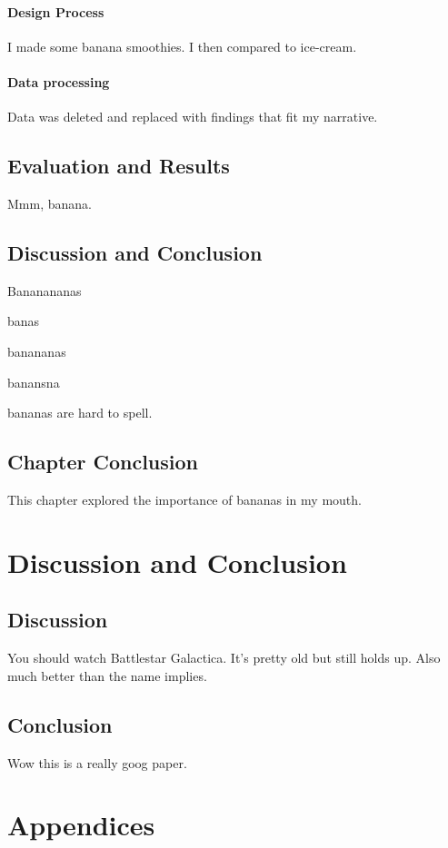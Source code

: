 \documentclass[oneside,openany]{report}
\let\Oldsection\section
\renewcommand{\section}{\FloatBarrier\Oldsection}
\begin{document}
\subsubsection{Design Process}
I made some banana smoothies. I then compared to ice-cream.

\subsubsection{Data processing}
Data was deleted and replaced with findings that fit my narrative. 

\section{Evaluation and Results}
\label{sec:chapter1_evaluation}
Mmm, banana.

\section{Discussion and Conclusion}
Bananananas

banas

banananas

banansna

bananas are hard to spell.

\section{Chapter Conclusion}
This chapter explored the importance of bananas in my mouth.

\chapter{Discussion and Conclusion}

\section{Discussion}
You should watch Battlestar Galactica. It's pretty old but still holds up. Also much better than the name implies. 

\section{Conclusion}
Wow this is a really goog paper.

\chapter{Appendices}
%
\end{document}
